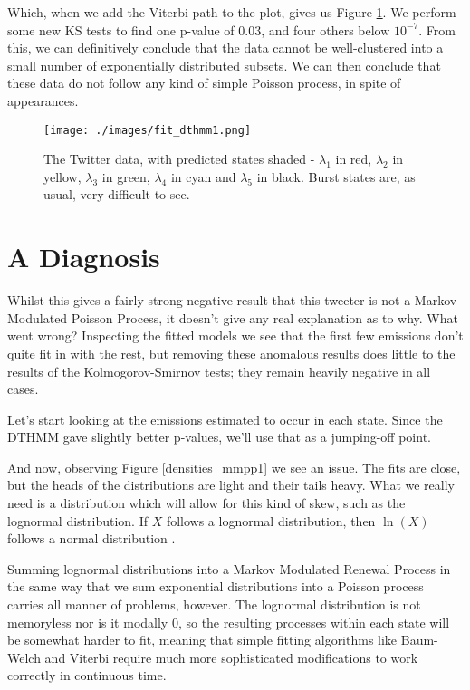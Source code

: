 Which, when we add the Viterbi path to the plot, gives us Figure \ref{fit_dthmm1}. We perform some new KS tests to find one p-value of 0.03, and four others below $10^{-7}$. From this, we can definitively conclude that the data cannot be well-clustered into a small number of exponentially distributed subsets. We can then conclude that these data do not follow any kind of simple Poisson process, in spite of appearances.

\begin{figure}[h!]
\centering
\texttt{[image: ./images/fit\_dthmm1.png]}
\caption{The Twitter data, with predicted states shaded - $\lambda_1$ in red, $\lambda_2$ in yellow, $\lambda_3$ in green, $\lambda_4$ in cyan and $\lambda_5$ in black. Burst states are, as usual, very difficult to see.}
\label{fit_dthmm1}
\end{figure}

\section{A Diagnosis}

Whilst this gives a fairly strong negative result that this tweeter is not a Markov Modulated Poisson Process, it doesn't give any real explanation as to why. What went wrong? Inspecting the fitted models we see that the first few emissions don't quite fit in with the rest, but removing these anomalous results does little to the results of the Kolmogorov-Smirnov tests; they remain heavily negative in all cases.

Let's start looking at the emissions estimated to occur in each state. Since the DTHMM gave slightly better p-values, we'll use that as a jumping-off point.

And now, observing Figure \ref{densities_mmpp1} we see an issue. The fits are close, but the heads of the distributions are light and their tails heavy. What we really need is a distribution which will allow for this kind of skew, such as the lognormal distribution. If $X$ follows a lognormal distribution, then $\ln(X)$ follows a normal distribution \cite{mwlognormal}.

Summing lognormal distributions into a Markov Modulated Renewal Process in the same way that we sum exponential distributions into a Poisson process carries all manner of problems, however. The lognormal distribution is not memoryless nor is it modally 0, so the resulting processes within each state will be somewhat harder to fit, meaning that simple fitting algorithms like Baum-Welch and Viterbi require much more sophisticated modifications to work correctly in continuous time.

